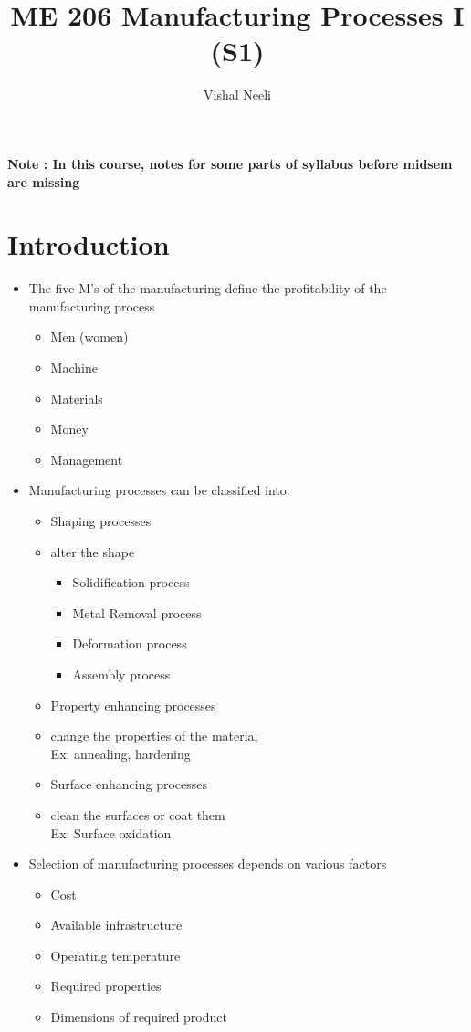 \documentclass{article}
\title{ME 206 Manufacturing Processes I (S1)}
\author{Vishal Neeli}
\begin{document}
\maketitle

\textbf{Note : In this course, notes for some parts of syllabus before midsem are missing}\\

\section{Introduction}

\begin{itemize}
	\item The five M's of the manufacturing define the profitability of the manufacturing process
	\begin{itemize}
		\item Men (women)
		\item Machine
		\item Materials
		\item Money 
		\item Management

	\end{itemize}

	\item Manufacturing processes can be classified into:
	\begin{itemize}
		\item Shaping processes \item alter the shape
		\begin{itemize}
			\item Solidification process
			\item Metal Removal process
			\item Deformation process
			\item Assembly process
		\end{itemize}
		\item Property enhancing processes \item change the properties of the material\\
		Ex: annealing, hardening
		\item Surface enhancing processes \item clean the surfaces or coat them\\
		Ex: Surface oxidation
	\end{itemize}


	\item Selection of manufacturing processes depends on various factors
	\begin{itemize}
		\item Cost 
		\item Available infrastructure
		\item Operating temperature
		\item Required properties
		\item Dimensions of required product
	\end{itemize}

\end{itemize}
\end{document}
